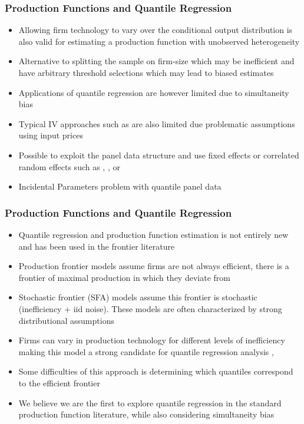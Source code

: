 \documentclass{beamer}
\begin{document}
\begin{frame}
\frametitle{Production Functions and Quantile Regression}
\begin{itemize}
	\item Allowing firm technology to vary over the conditional output distribution is also valid for estimating a production function with unobserved heterogeneity
	\item Alternative to splitting the sample on firm-size which may be inefficient and have arbitrary threshold selections which may lead to biased estimates
	\item Applications of quantile regression are however limited due to simultaneity bias
	\item Typical IV approaches such as \textcite{Chernozhukov2005} are also limited due problematic assumptions using input prices
	\item Possible to exploit the panel data structure and use fixed effects or correlated random effects such as \textcite{Koenker2004}, \textcite{Lamarche2010}, or \textcite{Canay2011}
	\item Incidental Parameters problem with quantile panel data
\end{itemize}
\end{frame}


\begin{frame}
\frametitle{Production Functions and Quantile Regression}
\begin{itemize}
	\item Quantile regression and production function estimation is not entirely new and has been used in the frontier literature
	\item Production frontier models assume firms are not always efficient, there is a frontier of maximal production in which they deviate from
	\item Stochastic frontier (SFA) models assume this frontier is stochastic (inefficiency + iid noise). These models are often characterized by strong distributional assumptions 
	\item Firms can vary in production technology for different levels of inefficiency making this model a strong candidate for quantile regression analysis \parencite{Bernini2004}, \parencite{Liu2008}
	\item Some difficulties of this approach is determining which quantiles correspond to the efficient frontier
	\item We believe we are the first to explore quantile regression in the standard production function literature, while also considering simultaneity bias
\end{itemize}
\end{frame}
\end{document}
